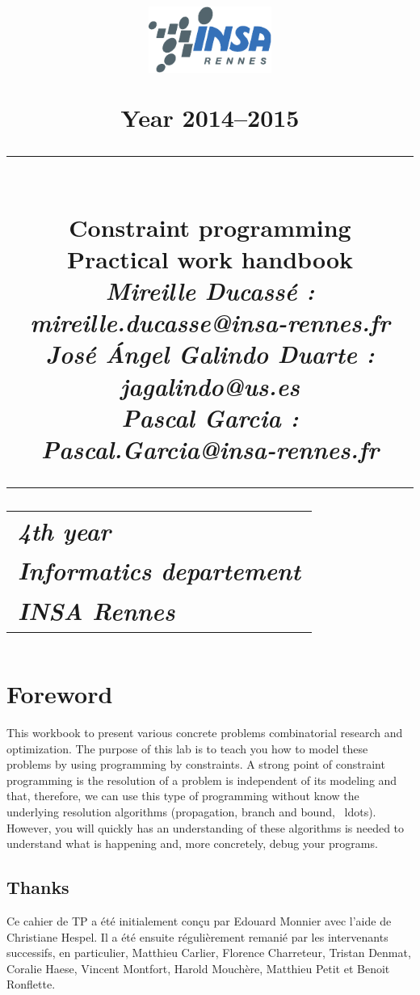 \documentclass[12pt]{report}
\title{
\begin{flushleft}
{\includegraphics[width=4cm]{insa.pdf}}
\vspace{-2cm}
\end{flushleft}
\begin{flushright}
\normalsize
Year 2014--2015
\end{flushright}
\vspace{10ex}
\rule{12cm}{1mm}
\huge{\\Constraint programming}\\
\vspace{5ex}
\Large{Practical work handbook}\\
\vspace{5ex}
\large{\it Mireille Ducassé : mireille.ducasse@insa-rennes.fr\\
José Ángel Galindo Duarte : jagalindo@us.es\\
Pascal Garcia : Pascal.Garcia@insa-rennes.fr
}\\
\rule{12cm}{1mm}
\vspace{15ex}
\begin{flushleft}
\begin{tabular}{l}
\textit{4th year}\\
\textit{Informatics departement}\\
\textit{INSA Rennes}
\end{tabular}
\end{flushleft}
}
\author{}
\date{}
\begin{document}
\pagestyle{empty}
\maketitle
\pagestyle{plain}
\renewcommand{\chaptername}{TP} %
\renewcommand{\thechapter}{\arabic{chapter}}
\renewcommand{\thesection}{\arabic{section}}
\renewcommand{\thesubsection}{\thesection.\arabic{subsection}}

{
\setlength{\baselineskip}{1.8\baselineskip} %
\renewcommand{\contentsname}{\centerline{Sommaire}} %
\tableofcontents
}

\cleardoublepage
\chapter*{Foreword}

This workbook to present various concrete problems
combinatorial research and optimization. The purpose of this lab is to
teach you how to model these problems by using programming
by constraints. A strong point of constraint programming is
the resolution of a problem is independent of its modeling and
that, therefore, we can use this type of programming without
know the underlying resolution algorithms (propagation,
branch and bound, \ ldots). However, you will quickly
has an understanding of these algorithms is needed to
understand what is happening and, more concretely, debug your
programs.



\section*{Thanks}

Ce cahier de TP a été initialement conçu par Edouard Monnier avec
l'aide de Christiane Hespel. Il a été ensuite régulièrement remanié
par les intervenants successifs, en particulier, Matthieu Carlier,
Florence Charreteur, Tristan Denmat, Coralie Haese, Vincent Montfort,
Harold Mouchère, Matthieu Petit et Benoit Ronflette.






\end{document}
